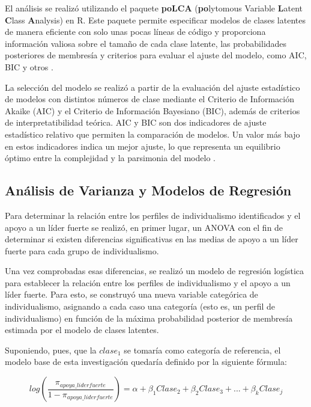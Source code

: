 \documentclass[12pt,twoside]{templates/facsothesis}
\begin{document}
El análisis se realizó utilizando el paquete \textbf{poLCA} (\textbf{po}lytomous Variable \textbf{L}atent \textbf{C}lass \textbf{A}nalysis) en R. Este paquete permite especificar modelos de clases latentes de manera eficiente con solo unas pocas líneas de código y proporciona información valiosa sobre el tamaño de cada clase latente, las probabilidades posteriores de membresía y criterios para evaluar el ajuste del modelo, como AIC, BIC y otros \citep{linzer2011}.

La selección del modelo se realizó a partir de la evaluación del ajuste estadístico de modelos con distintos números de clase mediante el Criterio de Información Akaike (AIC) y el Criterio de Información Bayesiano (BIC), además de criterios de interpretatibilidad teórica. AIC y BIC son dos indicadores de ajuste estadístico relativo que permiten la comparación de modelos. Un valor más bajo en estos indicadores indica un mejor ajuste, lo que representa un equilibrio óptimo entre la complejidad y la parsimonia del modelo \citep{collins2010}.

\hypertarget{anuxe1lisis-de-varianza-y-modelos-de-regresiuxf3n}{%
\subsection*{Análisis de Varianza y Modelos de Regresión}\label{anuxe1lisis-de-varianza-y-modelos-de-regresiuxf3n}}

Para determinar la relación entre los perfiles de individualismo identificados y el apoyo a un líder fuerte se realizó, en primer lugar, un ANOVA con el fin de determinar si existen diferencias significativas en las medias de apoyo a un líder fuerte para cada grupo de individualismo.

Una vez comprobadas esas diferencias, se realizó un modelo de regresión logística para establecer la relación entre los perfiles de individualismo y el apoyo a un líder fuerte. Para esto, se construyó una nueva variable categórica de individualismo, asignando a cada caso una categoría (esto es, un perfil de individualismo) en función de la máxima probabilidad posterior de membresía estimada por el modelo de clases latentes.

Suponiendo, pues, que la \(clase_1\) se tomaría como categoría de referencia, el modelo base de esta investigación quedaría definido por la siguiente fórmula:

\[log(\frac{\pi_{apoya\_liderfuerte}}
{1-\pi_{apoya\_liderfuerte}}) = \alpha + \beta_1Clase_2 + \beta_2Clase_3 + ... + \beta_kClase_j \]
\end{document}
